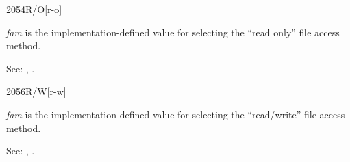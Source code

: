 \begin{newword}{2054}{R/O}[r-o]

	\emph{fam} is the implementation-defined value for selecting
	the ``read only'' file access method.

\item[See:]	
	,
	.
\end{newword}


\begin{newword}{2056}{R/W}[r-w]

	\emph{fam} is the implementation-defined value for selecting
	the ``read/write'' file access method.

\item[See:]
	,
	.
\end{newword}


